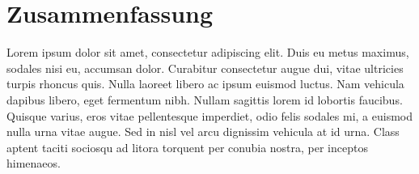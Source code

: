 \chapter*{Zusammenfassung}

\begin{german}
Lorem ipsum dolor sit amet, consectetur adipiscing elit. Duis eu metus maximus, sodales nisi eu, accumsan dolor. Curabitur consectetur augue dui, vitae ultricies turpis rhoncus quis. Nulla laoreet libero ac ipsum euismod luctus. Nam vehicula dapibus libero, eget fermentum nibh. Nullam sagittis lorem id lobortis faucibus. Quisque varius, eros vitae pellentesque imperdiet, odio felis sodales mi, a euismod nulla urna vitae augue. Sed in nisl vel arcu dignissim vehicula at id urna. Class aptent taciti sociosqu ad litora torquent per conubia nostra, per inceptos himenaeos.
\end{german}